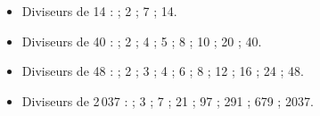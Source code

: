    \begin{itemize}
      \item Diviseurs de 14 : { ; 2 ; 7 ; 14}.
      \item Diviseurs de 40 : { ; 2 ; 4 ; 5 ; 8 ; 10 ; 20 ; 40}.
      \item Diviseurs de 48 : { ; 2 ; 3 ; 4 ; 6 ; 8 ; 12 ; 16 ; 24 ; 48}.
      \item Diviseurs de 2\,037 : { ; 3 ; 7 ; 21 ; 97 ; 291 ; 679 ; 2037}.
   \end{itemize}
